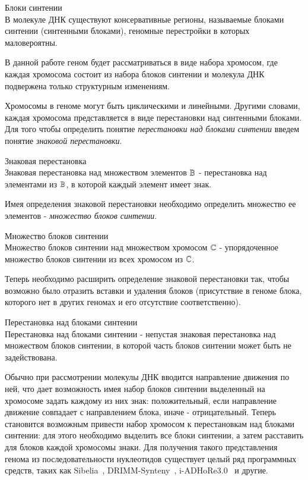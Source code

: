 \begin{define}{Блоки синтении} \\
  В молекуле ДНК существуют консервативные регионы, называемые блоками синтении (синтенными блоками),
  геномные перестройки в которых маловероятны.
\end{define}

В данной работе геном будет рассматриваться в виде набора хромосом,
где каждая хромосома состоит из набора блоков синтении и молекула ДНК подвержена только структурным изменениям.

Хромосомы в геноме могут быть циклическими и линейными.
Другими словами, каждая хромосома представляется в виде перестановки над синтенными блоками.
Для того чтобы определить понятие \textit{перестановки над блоками синтении} введем понятие \textit{знаковой перестановки}.
\begin{define}{Знаковая перестановка} \\
  Знаковая перестановка над множеством элементов $\mathbb{B}$ - перестановка над элементами из $\mathbb{B}$, в которой каждый элемент имеет знак.
\end{define}
Имея определения знаковой перестановки необходимо определить множество ее элементов - \textit{множество блоков синтении}.
\begin{define}{Множество блоков синтении} \\
  Множество блоков синтении над множеством хромосом $\mathbb{C}$ - упорядоченное множество блоков синтении из всех хромосом из $\mathbb{C}$.
\end{define}
Теперь необходимо расширить определение знаковой перестановки так, чтобы возможно было отразить вставки и удаления блоков
(присутствие в геноме блока, которого нет в других геномах и его отсутствие соответственно).
\begin{define}{Перестановка над блоками синтении} \\
  Перестановка над блоками синтении - непустая знаковая перестановка над множеством блоков синтении,
  в которой часть блоков синтении может быть не задействована.
\end{define}
Обычно при рассмотрении молекулы ДНК вводится направление движения по ней,
что дает возможность имея набор блоков синтении выделенный на хромосоме задать каждому из них знак:
положительный, если направление движение совпадает с направлением блока, иначе - отрицательный.
Теперь становится возможным привести набор хромосом к перестановкам над блоками синтении:
для этого необходимо выделить все блоки синтении, а затем расставить для блоков каждой хромосомы знаки.
Для получения такого представления генома из последовательности нуклеотидов существует целый ряд программных средств,
таких как Sibelia~\cite{minkin2013sibelia}, DRIMM-Synteny~\cite{pham2010drimm}, i-ADHoRe3.0~\cite{proost2012adhore} и другие.

